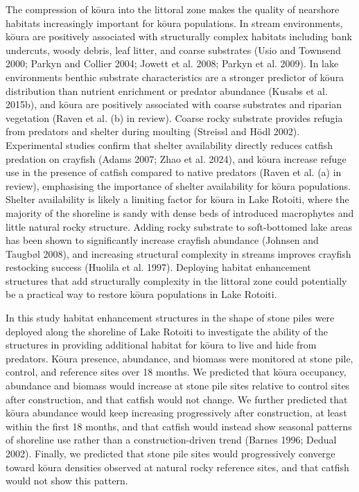 \documentclass[
  12pt,
  a4paper,
  oneside]{scrbook}
\begin{document}
The compression of kōura into the littoral zone makes the quality of
nearshore habitats increasingly important for kōura populations. In
stream environments, kōura are positively associated with structurally
complex habitats including bank undercuts, woody debris, leaf litter,
and coarse substrates (Usio and Townsend 2000; Parkyn and Collier 2004;
Jowett et al. 2008; Parkyn et al. 2009). In lake environments benthic
substrate characteristics are a stronger predictor of kōura distribution
than nutrient enrichment or predator abundance (Kusabs et al. 2015b),
and kōura are positively associated with coarse substrates and riparian
vegetation (Raven et al. (b) in review). Coarse rocky substrate provides
refugia from predators and shelter during moulting (Streissl and Hödl
2002). Experimental studies confirm that shelter availability directly
reduces catfish predation on crayfish (Adams 2007; Zhao et al. 2024),
and kōura increase refuge use in the presence of catfish compared to
native predators (Raven et al. (a) in review), emphasising the
importance of shelter availability for kōura populations. Shelter
availability is likely a limiting factor for kōura in Lake Rotoiti,
where the majority of the shoreline is sandy with dense beds of
introduced macrophytes and little natural rocky structure. Adding rocky
substrate to soft-bottomed lake areas has been shown to significantly
increase crayfish abundance (Johnsen and Taugbøl 2008), and increasing
structural complexity in streams improves crayfish restocking success
(Huolila et al. 1997). Deploying habitat enhancement structures that add
structurally complexity in the littoral zone could potentially be a
practical way to restore kōura populations in Lake Rotoiti.

In this study habitat enhancement structures in the shape of stone piles
were deployed along the shoreline of Lake Rotoiti to investigate the
ability of the structures in providing additional habitat for kōura to
live and hide from predators. Kōura presence, abundance, and biomass
were monitored at stone pile, control, and reference sites over 18
months. We predicted that kōura occupancy, abundance and biomass would
increase at stone pile sites relative to control sites after
construction, and that catfish would not change. We further predicted
that kōura abundance would keep increasing progressively after
construction, at least within the first 18 months, and that catfish
would instead show seasonal patterns of shoreline use rather than a
construction-driven trend (Barnes 1996; Dedual 2002). Finally, we
predicted that stone pile sites would progressively converge toward
kōura densities observed at natural rocky reference sites, and that
catfish would not show this pattern.
\end{document}
